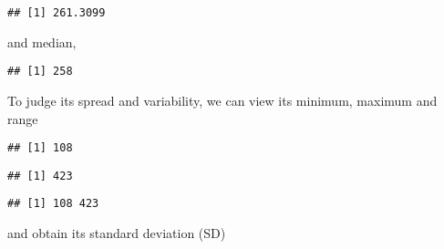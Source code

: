 \documentclass[]{book}
\newenvironment{Shaded}{\begin{snugshade}}{\end{snugshade}}
\newcommand{\KeywordTok}[1]{\textcolor[rgb]{0.13,0.29,0.53}{\textbf{{#1}}}}
\newcommand{\NormalTok}[1]{{#1}}
\theoremstyle{definition}
\theoremstyle{definition}
\theoremstyle{remark}
\begin{document}
\begin{Shaded}
\end{Shaded}

\begin{verbatim}
## [1] 261.3099
\end{verbatim}

and median,

\begin{Shaded}
\end{Shaded}

\begin{verbatim}
## [1] 258
\end{verbatim}

To judge its spread and variability, we can view its minimum, maximum
and range

\begin{Shaded}
\end{Shaded}

\begin{verbatim}
## [1] 108
\end{verbatim}

\begin{Shaded}
\end{Shaded}

\begin{verbatim}
## [1] 423
\end{verbatim}

\begin{Shaded}
\end{Shaded}

\begin{verbatim}
## [1] 108 423
\end{verbatim}

and obtain its standard deviation (SD)
\end{document}

